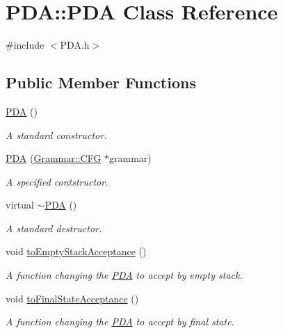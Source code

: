 \hypertarget{classPDA_1_1PDA}{\section{\-P\-D\-A\-:\-:\-P\-D\-A \-Class \-Reference}
\label{d1/dc5/classPDA_1_1PDA}
}


{\ttfamily \#include $<$\-P\-D\-A.\-h$>$}

\subsection*{\-Public \-Member \-Functions}
\begin{DoxyCompactItemize}
\item 
\hyperlink{classPDA_1_1PDA_a7785c447944c57243e2b1ea76903e3f6}{\-P\-D\-A} ()
\begin{DoxyCompactList}\small\item\em \-A standard constructor. \end{DoxyCompactList}\item 
\hyperlink{classPDA_1_1PDA_a07f2a525b64e07b62f6d8972aee2423d}{\-P\-D\-A} (\hyperlink{classGrammar_1_1CFG}{\-Grammar\-::\-C\-F\-G} $\ast$grammar)
\begin{DoxyCompactList}\small\item\em \-A specified contstructor. \end{DoxyCompactList}\item 
virtual \hyperlink{classPDA_1_1PDA_a9cd56fae8de9f1cc8a6b3da52d1b525f}{$\sim$\-P\-D\-A} ()
\begin{DoxyCompactList}\small\item\em \-A standard destructor. \end{DoxyCompactList}\item 
void \hyperlink{classPDA_1_1PDA_adeb9e042e871b40ad01630d4da2e7a6a}{to\-Empty\-Stack\-Acceptance} ()
\begin{DoxyCompactList}\small\item\em \-A function changing the \hyperlink{classPDA_1_1PDA}{\-P\-D\-A} to accept by empty stack. \end{DoxyCompactList}\item 
void \hyperlink{classPDA_1_1PDA_a6c6b86cde5edba8125fcf633d0a9a916}{to\-Final\-State\-Acceptance} ()
\begin{DoxyCompactList}\small\item\em \-A function changing the \hyperlink{classPDA_1_1PDA}{\-P\-D\-A} to accept by final state. \end{DoxyCompactList}\item 

\end{DoxyCompactItemize}
